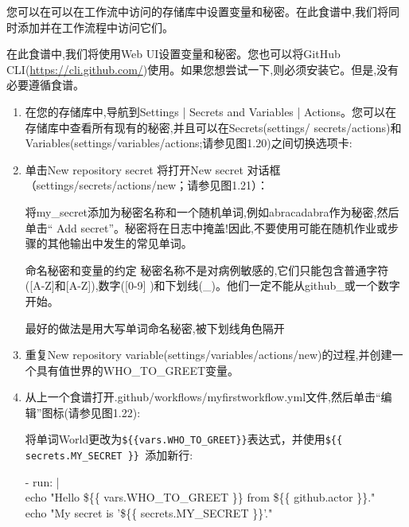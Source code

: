 
您可以在可以在工作流中访问的存储库中设置变量和秘密。在此食谱中,我们将同时添加并在工作流程中访问它们。


在此食谱中,我们将使用Web UI设置变量和秘密。您也可以将GitHub CLI(\url{https://cli.github.com/})使用。如果您想尝试一下,则必须安装它。但是,没有必要遵循食谱。


\begin{enumerate}
\item 
在您的存储库中,导航到Settings | Secrets and Variables | Actions。您可以在存储库中查看所有现有的秘密,并且可以在Secrets(settings/
secrets/actions)和Variables(settings/variables/actions;请参见图1.20)之间切换选项卡:


\item 
单击New repository secret 将打开New secret 对话框（settings/secrets/actions/new；请参见图1.21）：


将my\_secret添加为秘密名称和一个随机单词,例如abracadabra作为秘密,然后单击“ Add secret”。秘密将在日志中掩盖!因此,不要使用可能在随机作业或步骤的其他输出中发生的常见单词。

\begin{myTip}{命名秘密和变量的约定}
秘密名称不是对病例敏感的,它们只能包含普通字符([A-Z]和[A-Z]),数字([0-9] )和下划线(\_)。他们一定不能从github\_或一个数字开始。

最好的做法是用大写单词命名秘密,被下划线角色隔开
\end{myTip}

\item 
重复New repository variable(settings/variables/actions/new)的过程,并创建一个具有值世界的WHO\_TO\_GREET变量。

\item 
从上一个食谱打开.github/workflows/myfirstworkflow.yml文件,然后单击“编辑”图标(请参见图1.22):


将单词World更改为\verb|${{vars.WHO_TO_GREET}}|表达式，并使用\verb|${{ secrets.MY_SECRET }} |添加新行:

\begin{tcolorbox}[ breakable,colback = bashcodebg, colframe= black!50!white]
\scriptsize{
- run: | \\
\hspace*{2em}echo "Hello \$\{\{ vars.WHO\_TO\_GREET \}\}  from \$\{\{ github.actor \}\}." \\
\hspace*{2em}echo "My secret is  '\$\{\{ secrets.MY\_SECRET \}\}'."
}
\end{tcolorbox}


\end{enumerate}
